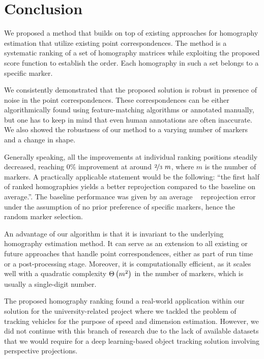 \section{Conclusion}

We proposed a method that builds on top of existing approaches for homography estimation that utilize existing point correspondences. The method is a systematic ranking of a set of homography matrices while exploiting the proposed score function to establish the order. Each homography in such a set belongs to a specific marker.

We consistently demonstrated that the proposed solution is robust in presence of noise in the point correspondences. These correspondences can be either algorithmically found using feature-matching algorithms or annotated manually, but one has to keep in mind that even human annotations are often inaccurate. We also showed the robustness of our method to a varying number of markers and a change in shape.

Generally speaking, all the improvements at individual ranking positions steadily decreased, reaching $0$\% improvement at around $\nicefrac{2}{3}~m$, where $m$ is the number of markers. A practically applicable statement would be the following: ``the first half of ranked homographies yields a better reprojection compared to the baseline on average.''. The baseline performance was given by an average \opencv{}~\cite{bradski2008learning} reprojection error under the assumption of no prior preference of specific markers, hence the random marker selection.

An advantage of our algorithm is that it is invariant to the underlying homography estimation method. It can serve as an extension to all existing or future approaches that handle point correspondences, either as part of run time or a post-processing stage. Moreover, it is computationally efficient, as it scales well with a quadratic complexity ${\Theta} \left( m^2 \right)$ in the number of markers, which is usually a single-digit number.

The proposed homography ranking found a real-world application within our solution for the university-related \interreg{} project where we tackled the problem of tracking vehicles for the purpose of speed and dimension estimation. However, we did not continue with this branch of research due to the lack of available datasets that we would require for a deep learning-based object tracking solution involving perspective projections.

